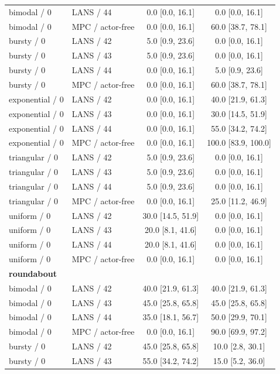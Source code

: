 \begin{longtable}{llcc}
bimodal / 0 & LANS / 44 & 0.0 [0.0, 16.1] & 0.0 [0.0, 16.1] \\
bimodal / 0 & MPC / actor-free & 0.0 [0.0, 16.1] & 60.0 [38.7, 78.1] \\
bursty / 0 & LANS / 42 & 5.0 [0.9, 23.6] & 0.0 [0.0, 16.1] \\
bursty / 0 & LANS / 43 & 5.0 [0.9, 23.6] & 0.0 [0.0, 16.1] \\
bursty / 0 & LANS / 44 & 0.0 [0.0, 16.1] & 5.0 [0.9, 23.6] \\
bursty / 0 & MPC / actor-free & 0.0 [0.0, 16.1] & 60.0 [38.7, 78.1] \\
exponential / 0 & LANS / 42 & 0.0 [0.0, 16.1] & 40.0 [21.9, 61.3] \\
exponential / 0 & LANS / 43 & 0.0 [0.0, 16.1] & 30.0 [14.5, 51.9] \\
exponential / 0 & LANS / 44 & 0.0 [0.0, 16.1] & 55.0 [34.2, 74.2] \\
exponential / 0 & MPC / actor-free & 0.0 [0.0, 16.1] & 100.0 [83.9, 100.0] \\
triangular / 0 & LANS / 42 & 5.0 [0.9, 23.6] & 0.0 [0.0, 16.1] \\
triangular / 0 & LANS / 43 & 5.0 [0.9, 23.6] & 0.0 [0.0, 16.1] \\
triangular / 0 & LANS / 44 & 5.0 [0.9, 23.6] & 0.0 [0.0, 16.1] \\
triangular / 0 & MPC / actor-free & 0.0 [0.0, 16.1] & 25.0 [11.2, 46.9] \\
uniform / 0 & LANS / 42 & 30.0 [14.5, 51.9] & 0.0 [0.0, 16.1] \\
uniform / 0 & LANS / 43 & 20.0 [8.1, 41.6] & 0.0 [0.0, 16.1] \\
uniform / 0 & LANS / 44 & 20.0 [8.1, 41.6] & 0.0 [0.0, 16.1] \\
uniform / 0 & MPC / actor-free & 0.0 [0.0, 16.1] & 0.0 [0.0, 16.1] \\
\multicolumn{4}{l}{\textbf{roundabout}} \\
bimodal / 0 & LANS / 42 & 40.0 [21.9, 61.3] & 40.0 [21.9, 61.3] \\
bimodal / 0 & LANS / 43 & 45.0 [25.8, 65.8] & 45.0 [25.8, 65.8] \\
bimodal / 0 & LANS / 44 & 35.0 [18.1, 56.7] & 50.0 [29.9, 70.1] \\
bimodal / 0 & MPC / actor-free & 0.0 [0.0, 16.1] & 90.0 [69.9, 97.2] \\
bursty / 0 & LANS / 42 & 45.0 [25.8, 65.8] & 10.0 [2.8, 30.1] \\
bursty / 0 & LANS / 43 & 55.0 [34.2, 74.2] & 15.0 [5.2, 36.0] \\

\end{longtable}
